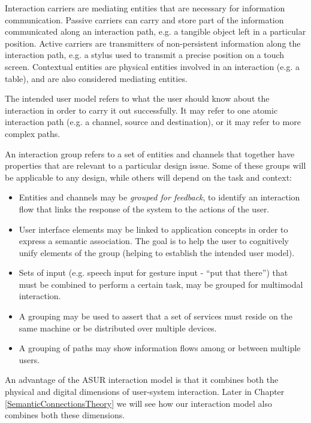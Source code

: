 Interaction carriers are mediating entities that are necessary for information communication. Passive carriers can carry and store part of the information communicated along an interaction path, e.g. a tangible object left in a particular position. Active carriers are transmitters of non-persistent information along the interaction path, e.g. a stylus used to transmit a precise position on a touch screen. Contextual entities are physical entities involved in an interaction (e.g. a table), and are also considered mediating entities.

The intended user model refers to what the user should know about the interaction in order to carry it out successfully. It may refer to one atomic interaction path (e.g. a channel, source and destination), or it may refer to more complex paths. 

An interaction group refers to a set of entities and channels that together have properties that are relevant to a particular design issue. Some of these groups will be applicable to any design, while others will depend on the task and context:

\begin{itemize}
\item Entities and channels may be \emph{grouped for feedback}, to identify an interaction flow that links the response of the system to the actions of the user.

\item User interface elements may be linked to application concepts in order to express a semantic association. The goal is to help the user to cognitively unify elements of the group (helping to establish the intended user model).

\item Sets of input (e.g. speech input for gesture input - ``put that there'') that must be combined to perform a certain task, may be grouped for multimodal interaction.

\item A grouping may be used to assert that a set of services must reside on the same machine or be distributed over multiple devices.

\item A grouping of paths may show information flows among or between multiple users.

\end{itemize}

An advantage of the \ac{ASUR} interaction model is that it combines both the physical and digital dimensions of user-system interaction. Later in Chapter \ref{SemanticConnectionsTheory} we will see how our interaction model also combines both these dimensions.

